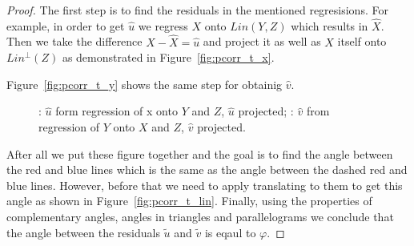 \begin{proof}
The first step is to find the residuals in the mentioned regresisions.
For example, in order to get $\hat u$ we regress $X$ onto $Lin(Y,Z)$
which results in $\hat X$. Then we take the difference $X - \hat X = \hat u$
and project it as well as $X$ itself onto $Lin^{\perp}(Z)$ as demonstrated
in Figure~\ref{fig:pcorr_t_x}.

Figure~\ref{fig:pcorr_t_y} shows the same step for obtainig $\hat v$.

\begin{figure}[ht!]
\begin{center}
\caption{: $\hat u$ form regression of x onto $Y$ and $Z$, $\hat u$ projected;
: $\hat v$ from regression of $Y$ onto $X$ and $Z$, $\hat v$ projected.}
\end{center}
\end{figure}

After all we put these figure together and the goal is to find the angle between
the red and blue lines which is the same as the angle between the dashed
red and blue lines. However, before that we need to apply translating to them to
get this angle as shown in Figure~\ref{fig:pcorr_t_lin}. Finally, using the properties of
complementary angles, angles in triangles and parallelograms
we conclude that the angle between the residuals $\tilde u$ and $\tilde v$
is eqaul to $\varphi$.


\end{proof}
